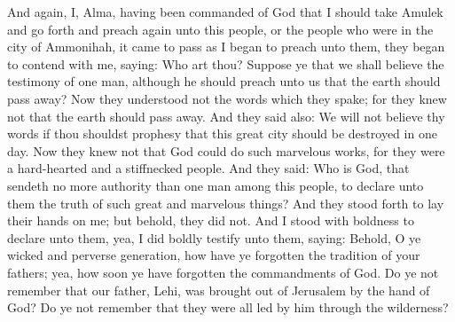 And again, I, Alma, having been commanded of God that I should take Amulek and go forth and preach again unto this people, or the people who were in the city of Ammonihah, it came to pass as I began to preach unto them, they began to contend with me, saying:
\bverse \iffalse Who art thou? Suppose ye that we shall believe the testimony of one man, although he should preach unto us that the earth should pass away? \fi
Who art thou? Suppose ye that we shall believe the testimony of one man, although he should preach unto us that the earth should pass away?
\bverse \iffalse Now they understood not the words which they spake; for they knew not that the earth should pass away. \fi
Now they understood not the words which they spake; for they knew not that the earth should pass away.
\bverse \iffalse And they said also: We will not believe thy words if thou shouldst prophesy that this great city should be destroyed in one day. \fi
And they said also: We will not believe thy words if thou shouldst prophesy that this great city should be destroyed in one day.
\bverse \iffalse Now they knew not that God could do such marvelous works, for they were a hard-hearted and a stiffnecked people. \fi
Now they knew not that God could do such marvelous works, for they were a hard-hearted and a stiffnecked people.
\bverse \iffalse And they said: Who is God, that sendeth no more authority than one man among this people, to declare unto them the truth of such great and marvelous things? \fi
And they said: Who is God, that sendeth no more authority than one man among this people, to declare unto them the truth of such great and marvelous things?
\bverse \iffalse And they stood forth to lay their hands on me; but behold, they did not. And I stood with boldness to declare unto them, yea, I did boldly testify unto them, saying: \fi
And they stood forth to lay their hands on me; but behold, they did not. And I stood with boldness to declare unto them, yea, I did boldly testify unto them, saying:
\bverse \iffalse Behold, O ye wicked and perverse generation, how have ye forgotten the tradition of your fathers; yea, how soon ye have forgotten the commandments of God. \fi
Behold, O ye wicked and perverse generation, how have ye forgotten the tradition of your fathers; yea, how soon ye have forgotten the commandments of God.
\bverse \iffalse Do ye not remember that our father, Lehi, was brought out of Jerusalem by the hand of God? Do ye not remember that they were all led by him through the wilderness? \fi
Do ye not remember that our father, Lehi, was brought out of Jerusalem by the hand of God? Do ye not remember that they were all led by him through the wilderness?
